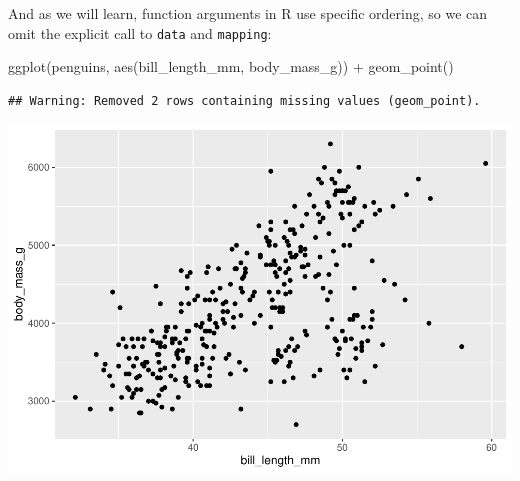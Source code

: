\documentclass[
]{article}
\newenvironment{Shaded}{\begin{snugshade}}{\end{snugshade}}
\newcommand{\FunctionTok}[1]{\textcolor[rgb]{0.00,0.00,0.00}{#1}}
\newcommand{\NormalTok}[1]{#1}
\newcommand{\SpecialCharTok}[1]{\textcolor[rgb]{0.00,0.00,0.00}{#1}}
\begin{document}
And as we will learn, function arguments in R use specific ordering, so
we can omit the explicit call to \texttt{data} and \texttt{mapping}:

\begin{Shaded}
\begin{Highlighting}[]
\FunctionTok{ggplot}\NormalTok{(penguins, }\FunctionTok{aes}\NormalTok{(bill\_length\_mm, body\_mass\_g)) }\SpecialCharTok{+}
  \FunctionTok{geom\_point}\NormalTok{()}
\end{Highlighting}
\end{Shaded}

\begin{verbatim}
## Warning: Removed 2 rows containing missing values (geom_point).
\end{verbatim}

\includegraphics{Grammar-of-Graphics_files/figure-latex/default4-1.pdf}
\end{document}
